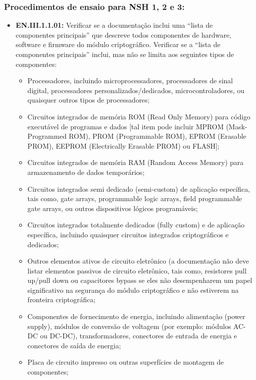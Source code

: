     \subsubsection*{Procedimentos de ensaio para NSH 1, 2 e 3:}
    \begin{itemize}[leftmargin=*, nosep]
        \item \textbf{EN.III.1.1.01:} Verificar se a documentação inclui uma “lista de componentes principais” que descreve todos componentes de hardware, software e firmware do módulo criptográfico. Verificar se a “lista de componentes principais” inclui, mas não se limita aos seguintes tipos de componentes:
        \begin{itemize}
            \item Processadores, incluindo microprocessadores, processadores de sinal digital, processadores  personalizados/dedicados, microcontroladores, ou quaisquer outros tipos de processadores;
            \item Circuitos integrados de memória ROM (Read Only Memory) para código executável de programas e dados [tal item pode incluir MPROM (Mask-Programmed ROM), PROM (Programmable ROM), EPROM (Erasable PROM), EEPROM (Electrically Erasable PROM) ou FLASH];
            \item Circuitos integrados de memória RAM (Random Access Memory) para armazenamento de dados temporários;
            \item Circuitos integrados semi dedicado (semi-custom) de aplicação específica, tais como, gate arrays, programmable logic arrays, field programmable gate arrays, ou outros dispositivos lógicos programáveis;
            \item Circuitos integrados totalmente dedicados (fully custom) e de aplicação específica, incluindo quaisquer circuitos integrados criptográficos e dedicados;
            \item Outros elementos ativos de circuito eletrônico (a documentação não deve listar elementos passivos de circuito eletrônico, tais como, resistores pull up/pull down ou capacitores bypass se eles não desempenharem um papel significativo na segurança do módulo criptográfico e não estiverem na fronteira criptográfica;
            \item Componentes de fornecimento de energia, incluindo alimentação (power supply), módulos de conversão de voltagem (por exemplo: módulos AC-DC ou DC-DC), transformadores, conectores de entrada de energia e conectores de saída de energia;
            \item Placa de circuito impresso ou outras superfícies de montagem de componentes;

\end{itemize}
\end{itemize}
